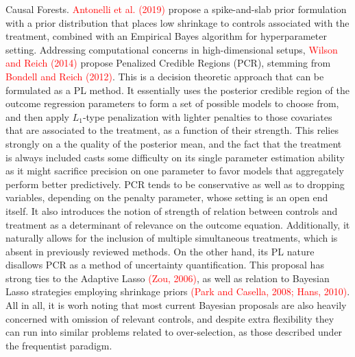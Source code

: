 \documentclass[12pt]{article}
\def\cred{\textcolor{red}}
\begin{document}
Causal Forests. \cred{Antonelli et al. (2019)} propose a spike-and-slab prior formulation with a prior distribution that places low shrinkage to controls associated with the treatment, combined with an Empirical Bayes algorithm for hyperparameter setting. Addressing computational concerns in high-dimensional setups, \cred{Wilson and Reich (2014)} propose Penalized Credible Regions (PCR), stemming from \cred{Bondell and Reich (2012)}. This is a decision theoretic approach that can be formulated as a PL method. It essentially uses the posterior credible region of the outcome regression parameters to form a set of possible models to choose from, and then apply $L_1$-type penalization with lighter penalties to those covariates that are associated to the treatment, as a function of their strength. This relies strongly on a the quality of the posterior mean, and the fact that the treatment is always included casts some difficulty on its single parameter estimation ability as it might sacrifice precision on one parameter to favor models that aggregately perform better predictively. PCR tends to be conservative as well as to dropping variables, depending on the penalty parameter, whose setting is an open end itself. It also introduces the notion of strength of relation between controls and treatment as a determinant of relevance on the outcome equation. Additionally, it naturally allows for the inclusion of multiple simultaneous treatments, which is absent in previously reviewed methods. On the other hand, its PL nature disallows PCR as a method of uncertainty quantification. This proposal has strong ties to the Adaptive Lasso \cred{(Zou, 2006)}, as well as relation to Bayesian Lasso strategies employing shrinkage priors \cred{(Park and Casella, 2008; Hans, 2010)}. All in all, it is worh noting that most current Bayesian proposals are also heavily concerned with omission of relevant controls, and despite extra flexibility they can run into similar problems related to over-selection, as those described under the frequentist paradigm.
% 
\end{document}
